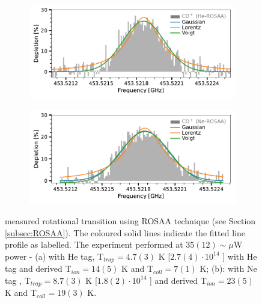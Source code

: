 \begin{figure}[!htb]
    \centering
    \begin{subfigure}[b]{0.49\textwidth}
        \centering
        \includegraphics[width=1\textwidth]{figures/measurements/THz/thz_CD+_He.pdf}
        \caption{}
        \label{fig:thz:HeCD+}
    \end{subfigure}
    \hfill
    \begin{subfigure}[b]{0.49\textwidth}
        \centering
        \includegraphics[width=1\textwidth]{figures/measurements/THz/thz_CD+_Ne.pdf}
        \caption{}
        \label{fig:thz:NeCD+}
    \end{subfigure}
    \caption{\CD measured \CDline rotational transition using ROSAA technique  (see Section \ref{subsec:ROSAA}). The coloured solid lines indicate the fitted line profile as labelled. The experiment performed at $35(12) \sim \mu$W power - (a) with He tag, T$_{trap}=4.7(3)$ K [$2.7(4) \cdot 10^{14}$ \percc] with He tag  and derived T$_{ion} = 14(5)$ K and T$_{coll} = 7(1)$ K; (b): with Ne tag , T$_{trap}=8.7(3)$ K [$1.8(2)\cdot 10^{14}$ \percc] and derived T$_{ion} = 23(5)$ K and T$_{coll} = 19(3)$ K.}
    \label{fig:thz}
\end{figure}